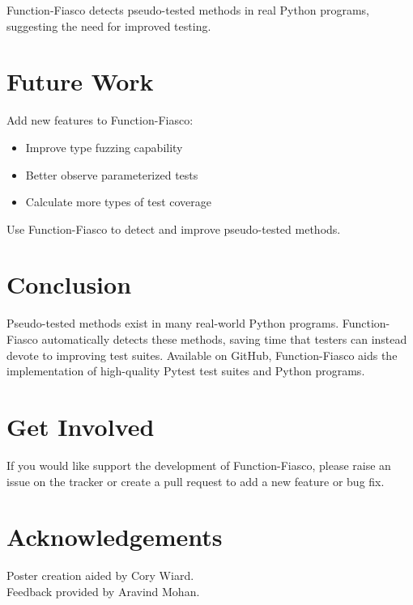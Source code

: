 \documentclass[a0paper,fleqn]{betterposter}
\begin{document}
{  \vspace*{-1in}

  

  \vspace*{-.5in}

  Function-Fiasco detects pseudo-tested methods in real Python programs,
  suggesting the need for improved testing.

  \section{Future Work}
  Add new features to Function-Fiasco: \\
  \vspace*{-.5in}

  \begin{itemize}[leftmargin=*]

    \item{Improve type fuzzing capability}
    \item{Better observe parameterized tests}
    \item{Calculate more types of test coverage}

  \end{itemize}

  \vspace{.5em}
  Use Function-Fiasco to detect and improve pseudo-tested methods.

  \section{Conclusion}
  Pseudo-tested methods exist in many real-world Python programs.
  Function-Fiasco automatically detects these methods, saving time that testers
  can instead devote to improving test suites.
  Available on GitHub, Function-Fiasco aids the implementation of high-quality
  Pytest test suites and Python programs.

  \section{Get Involved}
  If you would like support the development of Function-Fiasco, please raise an
  issue on the tracker or create a pull request to add a new feature or bug
  fix.
  \vfill

  \section{Acknowledgements}
  Poster creation aided by Cory Wiard.\\
  Feedback provided by Aravind Mohan.\\


}
\end{document}
